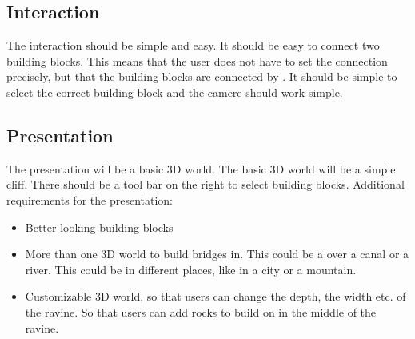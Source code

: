 \subsection{Interaction}
The interaction should be simple and easy. It should be easy to connect two building blocks. This means that the user does not have to set the connection precisely, but that the building blocks are connected by \name. It should be simple to select the correct building block and the camere should work simple.


\subsection{Presentation}
The presentation will be a basic 3D world. The basic 3D world will be a simple cliff. There should be a tool bar on the right to select building blocks.
Additional requirements for the presentation:
 \begin{itemize}
 \item Better looking building blocks
 \item More than one 3D world to build bridges in. This could be a over a canal or a river. This could be in different places, like in a city or a mountain.
 \item Customizable 3D world, so that users can change the depth, the width etc. of the ravine. So that users can add rocks to build on in the middle of the ravine.
 \end{itemize}